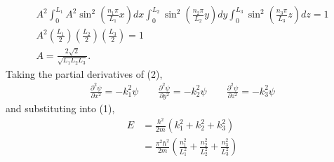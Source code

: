 \documentclass[a4paper,12pt]{article}
\begin{document}
\begin{enumerate}
\begin{gather*}
            A^2 \int_0^{L_1} A^2 \sin^2 \left( \frac{n_1 \pi}{L_1} x \right) dx \int_0^{L_2} \sin^2 \left( \frac{n_2 \pi}{L_2} y \right) dy \int_0^{L_3} \sin^2 \left( \frac{n_3 \pi}{L_3} z \right) dz = 1 \\
            A^2 \left( \frac{L_1}{2} \right) \left( \frac{L_2}{2} \right) \left( \frac{L_3}{2} \right) = 1 \\
            A = \frac{2 \sqrt{2}}{\sqrt{L_1 L_2 L_3}}.
        \end{gather*}
        Taking the partial derivatives of (2),
        \begin{align*}
            \frac{\partial^2 \psi}{\partial x^2} = -k_1^2 \psi \qquad \frac{\partial^2 \psi}{\partial y^2} = -k_2^2 \psi \qquad \frac{\partial^2 \psi}{\partial z^2} = -k_3^2 \psi
        \end{align*}
        and substituting into (1),
        \begin{align*}
            E &= \frac{\hbar^2}{2m} (k_1^2 + k_2^2 + k_3^2) \\
            &= \frac{\pi^2 \hbar^2}{2m} \left( \frac{n_1^2}{L_1^2} + \frac{n_2^2}{L_2^2} + \frac{n_3^2}{L_3^2} \right)
        \end{align*}

        \iffalse
        Because the Hamiltonian is the sum of three terms with separate independent variables, the solution to the differential equation has the form
        \begin{align*}
            \psi = f(x) g(y) h(z)
        \end{align*}
        so (1) can be separated into the three terms
        \begin{align*}
            \frac{-\hbar^2}{2m} \left( \frac{\partial^2 f(x)}{\partial x^2} \right) &= E_x f(x) \\
            \frac{-\hbar^2}{2m} \left( \frac{\partial^2 g(y)}{\partial y^2} \right) &= E_y g(y) \\
            \frac{-\hbar^2}{2m} \left( \frac{\partial^2 h(z)}{\partial z^2} \right) &= E_z h(z)
        \end{align*}
        where $E_x + E_y + E_z = E$. The solutions for the terms have the forms
        \begin{align*}
            f(x) &= 
        \end{align*}
        \fi
 

\end{enumerate}
\end{document}
